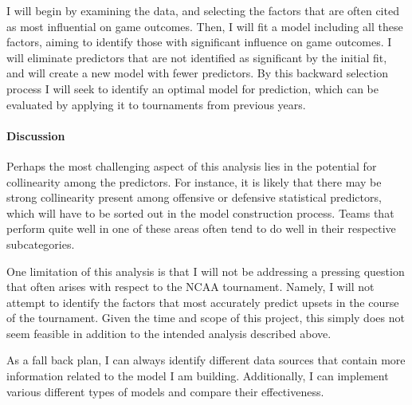 \documentclass[12pt]{article}
\begin{document}
I will begin by examining the data, and selecting the factors that are often cited as most influential on game outcomes.  Then, I will fit a model including all these factors, aiming to identify those with significant influence on game outcomes.  I will eliminate predictors that are not identified as significant by the initial fit, and will create a new model with fewer predictors.  By this backward selection process I will seek to identify an optimal model for prediction, which can be evaluated by applying it to tournaments from previous years.  


\paragraph{Discussion}
Perhaps the most challenging aspect of this analysis lies in the potential for collinearity among the predictors.  For instance, it is likely that there may be strong collinearity present among offensive or defensive statistical predictors, which will have to be sorted out in the model construction process.  Teams that perform quite well in one of these areas often tend to do well in their respective subcategories.

One limitation of this analysis is that I will not be addressing a pressing question that often arises with respect to the NCAA tournament.  Namely, I will not attempt to identify the factors that most accurately predict upsets in the course of the tournament.  Given the time and scope of this project, this simply does not seem feasible in addition to the intended analysis described above.  

As a fall back plan, I can always identify different data sources that contain more information related to the model I am building.  Additionally, I can implement various different types of models and compare their effectiveness. 



\end{document}
